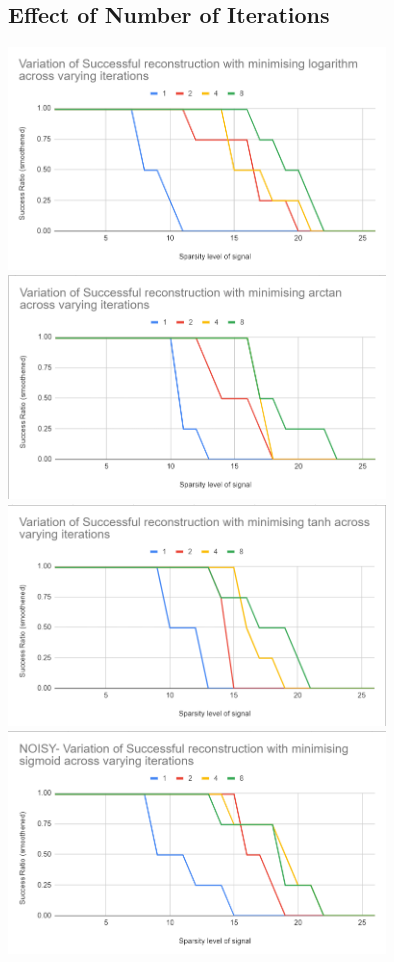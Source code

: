 \documentclass[a4paper,14pt]{article}
\numberwithin{definition}{section}
\numberwithin{mytheorem}{subsection}
\begin{document}
\subsection{Effect of Number of Iterations}

\begin{center}
    \includegraphics[width=10cm]{log_iterations_noisy.png}
    \includegraphics[width=10cm]{atan_iterations_noisy.png}
    \includegraphics[width=10cm]{tanh_iterations_noisy.png}
    \includegraphics[width=10cm]{sigmoid_iterations_noisy.png}
\end{center}
\end{document}
